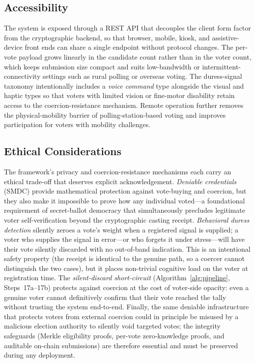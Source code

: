 \subsection{Accessibility}
The system is exposed through a REST API that decouples the client form factor from the cryptographic backend, so that browser, mobile, kiosk, and assistive-device front ends can share a single endpoint without protocol changes. The per-vote payload grows linearly in the candidate count rather than in the voter count, which keeps submission size compact and suits low-bandwidth or intermittent-connectivity settings such as rural polling or overseas voting. The duress-signal taxonomy intentionally includes a \emph{voice command} type alongside the visual and haptic types so that voters with limited vision or fine-motor disability retain access to the coercion-resistance mechanism. Remote operation further removes the physical-mobility barrier of polling-station-based voting and improves participation for voters with mobility challenges.

\subsection{Ethical Considerations}
The framework's privacy and coercion-resistance mechanisms each carry an ethical trade-off that deserves explicit acknowledgement. \emph{Deniable credentials} (SMDC) provide mathematical protection against vote-buying and coercion, but they also make it impossible to prove how any individual voted---a foundational requirement of secret-ballot democracy that simultaneously precludes legitimate voter self-verification beyond the cryptographic casting receipt. \emph{Behavioral duress detection} silently zeroes a vote's weight when a registered signal is supplied; a voter who supplies the signal in error---or who forgets it under stress---will have their vote silently discarded with no out-of-band indication. This is an intentional safety property (the receipt is identical to the genuine path, so a coercer cannot distinguish the two cases), but it places non-trivial cognitive load on the voter at registration time. The \emph{silent-discard short-circuit} (Algorithm~\ref{alg:pipeline}, Steps~17a--17b) protects against coercion at the cost of voter-side opacity: even a genuine voter cannot definitively confirm that their vote reached the tally without trusting the system end-to-end. Finally, the same deniable infrastructure that protects voters from external coercion could in principle be misused by a malicious election authority to silently void targeted votes; the integrity safeguards (Merkle eligibility proofs, per-vote zero-knowledge proofs, and auditable on-chain submissions) are therefore essential and must be preserved during any deployment.

